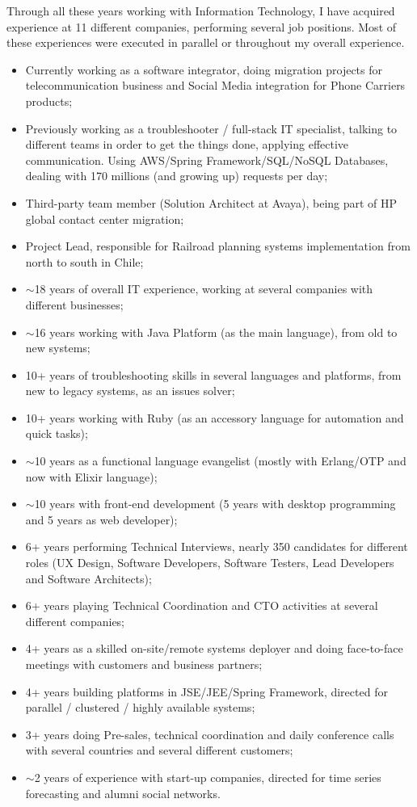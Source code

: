 
\begin{cvparagraph}

Through all these years working with Information Technology, I have acquired experience at 11 different companies, performing several job positions. Most of these experiences were executed in parallel or throughout my overall experience.

\begin{itemize}
\item Currently working as a software integrator, doing migration projects for telecommunication business and Social Media integration for Phone Carriers products;
\item Previously working as a troubleshooter / full-stack IT specialist, talking to different teams in order to get the things done, applying effective communication. Using AWS/Spring Framework/SQL/NoSQL Databases, dealing with 170 millions (and growing up) requests per day;
\item Third-party team member (Solution Architect at Avaya), being part of HP global contact center migration;
\item Project Lead, responsible for Railroad planning systems implementation from north to south in Chile;
\item $\sim$18 years of overall IT experience, working at several companies with different businesses;
\item $\sim$16 years working with Java Platform (as the main language), from old to new systems;
\item 10+ years of troubleshooting skills in several languages and platforms, from new to legacy systems, as an issues solver;
\item 10+ years working with Ruby  (as an accessory language for automation and quick tasks);
\item $\sim$10 years as a functional language evangelist (mostly with Erlang/OTP and now with Elixir language);
\item $\sim$10 years with front-end development (5 years with desktop programming and 5 years as web developer);
\item 6+ years performing Technical Interviews, nearly 350 candidates for different roles (UX Design, Software Developers, Software Testers, Lead Developers and Software Architects);
\item 6+ years playing Technical Coordination and CTO activities at several different companies;
\item 4+ years as a skilled on-site/remote systems deployer and doing face-to-face meetings with customers and business partners;
\item 4+ years building platforms in JSE/JEE/Spring Framework, directed for parallel / clustered / highly available systems;
\item 3+ years doing Pre-sales, technical coordination and daily conference calls with several countries and several different customers;
\item $\sim$2 years of experience with start-up companies, directed for time series forecasting and alumni social networks.
\end{itemize}
\end{cvparagraph}
